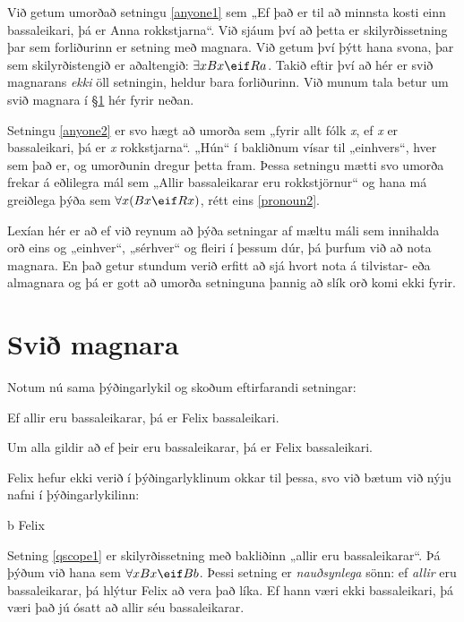 Við getum umorðað setningu \ref{anyone1} sem „Ef það er til að minnsta kosti einn bassaleikari, þá er Anna rokkstjarna“. Við sjáum því að þetta er skilyrðissetning þar sem forliðurinn er setning með magnara. Við getum því þýtt hana svona, þar sem skilyrðistengið er aðaltengið: $\exists x Bx \eif Ra$. Takið eftir því að hér er svið magnarans \emph{ekki} öll setningin, heldur bara forliðurinn. Við munum tala betur um svið magnara í \S\ref{s:quantscope} hér fyrir neðan.

Setningu \ref{anyone2} er svo hægt að umorða sem „fyrir allt fólk \emph{x}, ef \emph{x} er bassaleikari, þá er \emph{x} rokkstjarna“. „Hún“ í bakliðnum vísar til „einhvers“, hver sem það er, og umorðunin dregur þetta fram. Þessa setningu mætti svo umorða frekar á eðlilegra mál sem „Allir bassaleikarar eru rokkstjörnur“ og hana má greiðlega þýða sem $\forall x(Bx \eif Rx)$, rétt eins \ref{pronoun2}.

Lexían hér er að ef við reynum að þýða setningar af mæltu máli sem innihalda orð eins og „einhver“, „sérhver“ og fleiri í þessum dúr, þá þurfum við að nota magnara. En það getur stundum verið erfitt að sjá hvort nota á tilvistar- eða almagnara og þá er gott að umorða setninguna þannig að slík orð komi ekki fyrir. 

\section{Svið magnara}\label{s:quantscope}

Notum nú sama þýðingarlykil og skoðum eftirfarandi setningar:

	\begin{earg}
		\item[\ex{qscope1}] Ef allir eru bassaleikarar, þá er Felix bassaleikari.
		\item[\ex{qscope2}] Um alla gildir að ef þeir eru bassaleikarar, þá er Felix bassaleikari.
	\end{earg}
Felix hefur ekki verið í þýðingarlyklinum okkar til þessa, svo við bætum við nýju nafni í þýðingarlykilinn:	
	\begin{ekey}
		\item[b] Felix
	\end{ekey}
	
Setning	\ref{qscope1} er skilyrðissetning með bakliðinn „allir eru bassaleikarar“. Þá þýðum við hana sem $\forall x Bx \eif Bb$. Þessi setning er \emph{nauðsynlega} sönn: ef \emph{allir} eru bassaleikarar, þá hlýtur Felix að vera það líka. Ef hann væri ekki bassaleikari, þá væri það jú ósatt að allir séu bassaleikarar.

